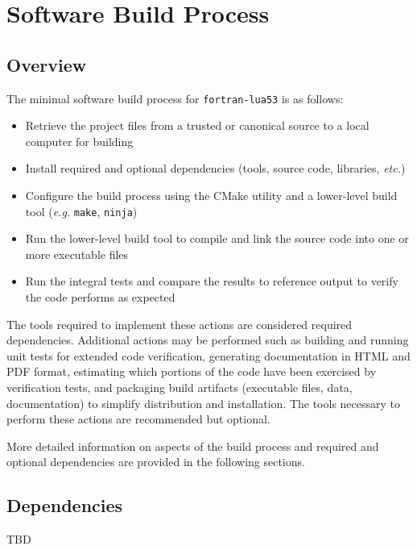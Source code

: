 \chapter{Software Build Process}

\section{Overview}

The minimal software build process for \texttt{fortran-lua53} is as follows:
\begin{itemize}
    \item Retrieve the project files from a trusted or canonical source
    to a local computer for building
    \item Install required and optional dependencies (tools, source
    code, libraries, \textit{etc.})
    \item Configure the build process using the CMake utility and a
    lower-level build tool (\textit{e.g.} \texttt{make},
    \texttt{ninja})
    \item Run the lower-level build tool to compile and link the source
    code into one or more executable files
    \item Run the integral tests and compare the results to reference
    output to verify the code performs as expected
\end{itemize}

The tools required to implement these actions are considered required
dependencies. Additional actions may be performed such as building and
running unit tests for extended code verification, generating
documentation in HTML and PDF format, estimating which portions of the
code have been exercised by verification tests, and packaging build
artifacts (executable files, data, documentation) to simplify
distribution and installation. The tools necessary to perform these
actions are recommended but optional.

More detailed information on aspects of the build process and required
and optional dependencies are provided in the following sections.

\section{Dependencies}

TBD



